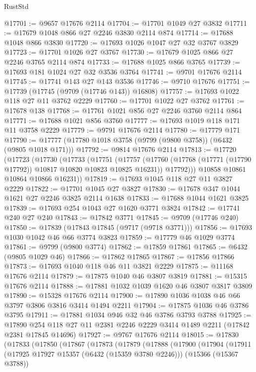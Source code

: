 \begin{lexlean}{RustStd}
\begin{coremodule}
@17701 := @9657 @17676 @2114
@17704 := @17701 @1049 @27 @3832
@17711 := @17679 @1048 @866 @27 @2246 @3830 @2114 @874
@17714 := @17688 @1048 @866 @3830
@17720 := @17693 @1026 @1047 @27 @32 @3767 @3829
@17723 := @17701 @1026 @27 @3767
@17730 := @17679 @1025 @866 @27 @2246 @3765 @2114 @874
@17733 := @17688 @1025 @866 @3765
@17739 := @17693 @181 @1024 @27 @32 @3536 @3764
@17741 := @9701 @17676 @2114
@17745 := @17741 @143 @27 @143 @3536
@17746 := @9710 @17676
@17751 := @17739 (@17745 (@9709 (@17746 @143)) @16808)
@17757 := @17693 @1022 @118 @27 @11 @3762 @2229
@17760 := @17701 @1022 @27 @3762
@17761 := @17678 @138
@17768 := @17761 @1021 @856 @27 @2246 @3760 @2114 @864
@17771 := @17688 @1021 @856 @3760
@17777 := @17693 @1019 @118 @171 @11 @3758 @2229
@17779 := @9791 @17676 @2114
@17780 := @17779 @171
@17790 := @17777 (@17780 @1018 @3758 (@9799 (@9800 @3758)) (@6432 (@9805 @1018 @171)))
@17792 := @9814 @17676 @2114
@17813 := @17720
    (@17723
      (@17730
        (@17733
          (@17751
            (@17757
              (@17760 (@17768 (@17771 (@17790 @17792)) @10817 @10820 @10823 @10825 @16231))
              @17792)))
        @10858
        @10861
        @10864
        @10866
        @16231))
@17819 := @17693 @1045 @118 @27 @11 @3827 @2229
@17822 := @17701 @1045 @27 @3827
@17830 := @17678 @347 @1044 @1621 @27 @2246 @3825 @2114 @1638
@17833 := @17688 @1044 @1621 @3825
@17839 := @17693 @254 @1043 @27 @1620 @3771 @3824
@17842 := @17741 @240 @27 @240
@17843 := @17842 @3771
@17845 := @9709 (@17746 @240)
@17850 := @17839 (@17843 @17845 (@9717 (@9718 @3771)))
@17856 := @17693 @1030 @1042 @46 @66 @3774 @3823
@17859 := @17779 @46 @1029 @3774
@17861 := @9799 (@9800 @3774)
@17862 := @17859 @17861
@17865 := @6432 (@9805 @1029 @46)
@17866 := @17862 @17865
@17867 := @17856 @17866
@17873 := @17693 @1040 @118 @46 @11 @3821 @2229
@17875 := @11168 @17676 @2114
@17879 := @17875 @1040 @46 @3807 @3819
@17881 := @15315 @17676 @2114
@17888 := @17881 @1032 @1039 @1620 @46 @3807 @3817 @3809
@17890 := @15328 @17676 @2114
@17900 := @17890 @1036 @1038 @46 @66 @3797 @3806 @3816 @3414 @1494 @2211
@17904 := @17875 @1036 @46 @3786 @3795
@17911 := @17881 @1034 @946 @32 @46 @3786 @3793 @3788
@17925 := @17890 @254 @118 @27 @11 @2381 @2246 @2229 @3414 @1489 @2211 (@17842 @2381 @17845 @14696)
@17927 := @9767 @17676 @2114
@18015 := @17830
    (@17833
      (@17850
        (@17867
          (@17873
            (@17879
              (@17888
                (@17900
                  (@17904
                    (@17911
                      (@17925 @17927 @15357 (@6432 (@15359 @3780 @2246)))
                      (@15366 (@15367 @3788))

\end{coremodule}
\end{lexlean}
